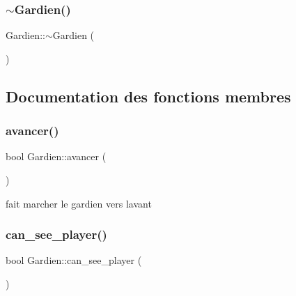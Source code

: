\mbox{\label{classGardien_afef6202d924fef9d882bb40dfc4ac9fb}} 
\subsubsection{\texorpdfstring{$\sim$\+Gardien()}{~Gardien()}}
{\footnotesize\ttfamily Gardien\+::$\sim$\+Gardien (\begin{DoxyParamCaption}{ }\end{DoxyParamCaption})\hspace{0.3cm}{\ttfamily [inline]}}



\subsection{Documentation des fonctions membres}
\mbox{\label{classGardien_a1ba8ec13ead6e60ab60b9944a89212fc}} 
\subsubsection{\texorpdfstring{avancer()}{avancer()}}
{\footnotesize\ttfamily bool Gardien\+::avancer (\begin{DoxyParamCaption}{ }\end{DoxyParamCaption})\hspace{0.3cm}{\ttfamily [private]}}



fait marcher le gardien vers l\textquotesingle{}avant 

\mbox{\label{classGardien_ab4cae0375789f78258d37ccb16004a4d}} 
\subsubsection{\texorpdfstring{can\+\_\+see\+\_\+player()}{can\_see\_player()}}
{\footnotesize\ttfamily bool Gardien\+::can\+\_\+see\+\_\+player (\begin{DoxyParamCaption}{ }\end{DoxyParamCaption})\hspace{0.3cm}{\ttfamily [private]}}



